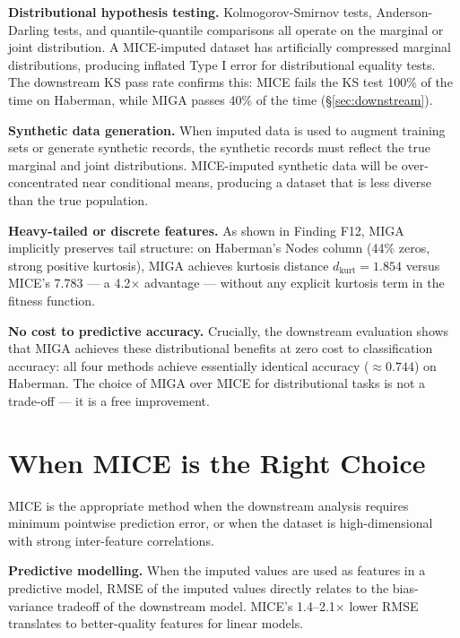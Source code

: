 \textbf{Distributional hypothesis testing.} Kolmogorov-Smirnov tests, Anderson-Darling tests, and quantile-quantile comparisons all operate on the marginal or joint distribution. A MICE-imputed dataset has artificially compressed marginal distributions, producing inflated Type I error for distributional equality tests. The downstream KS pass rate confirms this: MICE fails the KS test 100\% of the time on Haberman, while MIGA passes 40\% of the time (§\ref{sec:downstream}).

\textbf{Synthetic data generation.} When imputed data is used to augment training sets or generate synthetic records, the synthetic records must reflect the true marginal and joint distributions. MICE-imputed synthetic data will be over-concentrated near conditional means, producing a dataset that is less diverse than the true population.

\textbf{Heavy-tailed or discrete features.} As shown in Finding F12, MIGA implicitly preserves tail structure: on Haberman's Nodes column (44\% zeros, strong positive kurtosis), MIGA achieves kurtosis distance $d_{\text{kurt}} = 1.854$ versus MICE's 7.783 --- a 4.2$\times$ advantage --- without any explicit kurtosis term in the fitness function.

\textbf{No cost to predictive accuracy.} Crucially, the downstream evaluation shows that MIGA achieves these distributional benefits at zero cost to classification accuracy: all four methods achieve essentially identical accuracy ($\approx 0.744$) on Haberman. The choice of MIGA over MICE for distributional tasks is not a trade-off --- it is a free improvement.


\section{When MICE is the Right Choice}

MICE is the appropriate method when the downstream analysis requires minimum pointwise prediction error, or when the dataset is high-dimensional with strong inter-feature correlations.

\textbf{Predictive modelling.} When the imputed values are used as features in a predictive model, RMSE of the imputed values directly relates to the bias-variance tradeoff of the downstream model. MICE's 1.4--2.1$\times$ lower RMSE translates to better-quality features for linear models.

